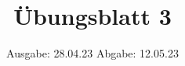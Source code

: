 

\title{Übungsblatt 3}
\date{%
  Ausgabe: 28.04.23 %
  \hspace{3em}
  Abgabe: 12.05.23 %
}



\maketitle
\thispagestyle{empty}
\tableofcontents
\newpage





